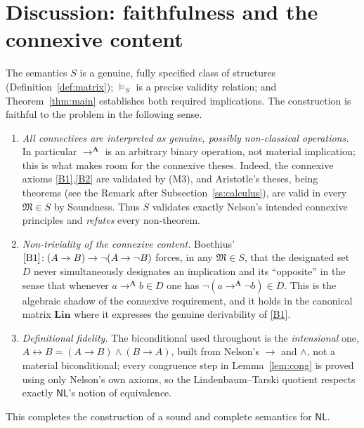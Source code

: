 \documentclass[12pt]{article}
\theoremstyle{definition}
\newcommand{\NL}{\mathsf{NL}}
\newcommand{\vld}{\vDash}
\newcommand{\imp}{\rightarrow}
\newcommand{\bic}{\leftrightarrow}
\newcommand{\A}{\mathbf{A}}
\newcommand{\Lin}{\mathbf{Lin}}
\begin{document}
\section{Discussion: faithfulness and the connexive content}

The semantics $S$ is a genuine, fully specified class of structures
(Definition~\ref{def:matrix}); $\vld_{S}$ is a precise validity relation; and
Theorem~\ref{thm:main} establishes both required implications. The construction
is faithful to the problem in the following sense.

\begin{enumerate}
\item \emph{All connectives are interpreted as genuine, possibly
non-classical operations.} In particular $\imp^{\A}$ is an arbitrary binary
operation, not material implication; this is what makes room for the connexive
theses. Indeed, the connexive axioms \eqref{B1},\eqref{B2} are validated by
(M3), and Aristotle's theses, being theorems (see the Remark after
Subsection~\ref{ss:calculus}), are valid in every $\mathfrak M\in S$ by
Soundness. Thus $S$ validates exactly Nelson's intended connexive principles and
\emph{refutes} every non-theorem.

\item \emph{Non-triviality of the connexive content.} Boethius'
$\eqref{B1}\!:(A\imp B)\imp\neg(A\imp\neg B)$ forces, in any $\mathfrak M\in S$,
that the designated set $D$ never simultaneously designates an implication and
its ``opposite'' in the sense that whenever $a\imp^{\A}b\in D$ one has
$\neg(a\imp^{\A}\neg b)\in D$. This is the algebraic shadow of the connexive
requirement, and it holds in the canonical matrix $\Lin$ where it expresses the
genuine derivability of \eqref{B1}.

\item \emph{Definitional fidelity.} The biconditional used throughout is the
\emph{intensional} one, $A\bic B=(A\imp B)\wedge(B\imp A)$, built from Nelson's
$\imp$ and $\wedge$, not a material biconditional; every congruence step in
Lemma~\ref{lem:cong} is proved using only Nelson's own axioms, so the
Lindenbaum--Tarski quotient respects exactly $\NL$'s notion of equivalence.
\end{enumerate}

This completes the construction of a sound and complete semantics for $\NL$.
\end{document}
